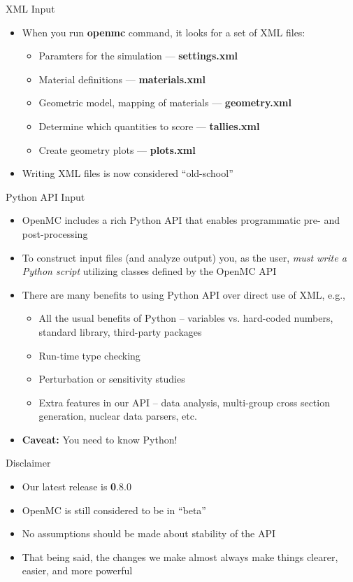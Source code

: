 \documentclass[noamssymb,svgnames]{beamer}
\begin{document}
\begin{frame}{XML Input}
  \begin{itemize}
  \item When you run \textbf{openmc} command, it looks for a set of XML files:
    \begin{itemize}
    \item Paramters for the simulation --- \textbf{settings.xml}
    \item Material definitions --- \textbf{materials.xml}
    \item Geometric model, mapping of materials --- \textbf{geometry.xml}
    \item Determine which quantities to score --- \textbf{tallies.xml}
    \item Create geometry plots --- \textbf{plots.xml}
    \end{itemize}
  \item Writing XML files is now considered ``old-school''
  \end{itemize}
\end{frame}

\begin{frame}{Python API Input}
  \begin{itemize}
  \item OpenMC includes a rich Python API that enables programmatic pre- and
    post-processing
  \item To construct input files (and analyze output) you, as the user,
    \emph{must write a Python script} utilizing classes defined by the OpenMC
    API
  \item There are many benefits to using Python API over direct use of XML,
    e.g.,
    \begin{itemize}
    \item All the usual benefits of Python -- variables vs. hard-coded numbers,
      standard library, third-party packages
    \item Run-time type checking
    \item Perturbation or sensitivity studies
    \item Extra features in our API -- data analysis, multi-group cross section
      generation, nuclear data parsers, etc.
    \end{itemize}
  \item \textbf{Caveat:} You need to know Python!
  \end{itemize}
\end{frame}

\begin{frame}{Disclaimer}
  \begin{itemize}
  \item Our latest release is \textbf{0}.8.0
  \item OpenMC is still considered to be in ``beta''
  \item No assumptions should be made about stability of the API
  \item That being said, the changes we make almost always make things clearer,
    easier, and more powerful
  \end{itemize}
\end{frame}
\end{document}
